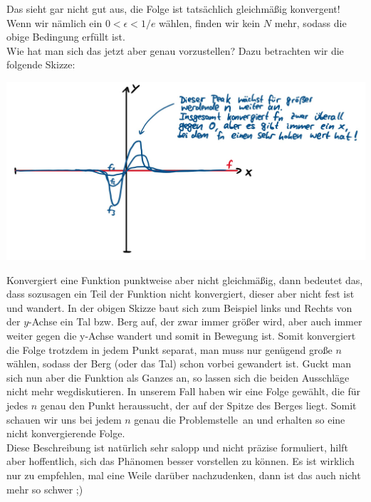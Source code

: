 \begin{Beispiel}
\begin{equation*}
    \end{equation*}
    Das sieht gar nicht gut aus, die Folge ist tatsächlich  gleichmäßig konvergent! Wenn wir nämlich ein $0<\epsilon < 1/e$ wählen, finden wir kein $N$ mehr, sodass die obige Bedingung erfüllt ist. \\
    Wie hat man sich das jetzt aber genau vorzustellen? Dazu betrachten wir die folgende Skizze:
    \begin{center}
        \includegraphics[width=.95\textwidth]{Dateien/06/06VeranschaulichungFunktionenfolgen.jpg}
    \end{center}
    Konvergiert eine Funktion punktweise aber nicht gleichmäßig, dann bedeutet das, dass sozusagen ein Teil der Funktion nicht konvergiert, dieser aber nicht fest ist und \glqq wandert\grqq. In der obigen Skizze baut sich zum Beispiel links und Rechts von der $y$-Achse ein Tal bzw. Berg auf, der zwar immer größer wird, aber auch immer weiter gegen die y-Achse wandert und somit in Bewegung ist. Somit konvergiert die Folge trotzdem in jedem Punkt separat, man muss nur genügend große $n$ wählen, sodass der Berg (oder das Tal) schon vorbei gewandert ist. Guckt man sich nun aber die Funktion als Ganzes an, so lassen sich die beiden Ausschläge nicht mehr wegdiskutieren. In unserem Fall haben wir eine Folge gewählt, die für jedes $n$ genau den Punkt heraussucht, der auf der Spitze des Berges liegt. Somit schauen wir uns bei jedem $n$ genau die \glqq Problemstelle\grqq~an und erhalten so eine nicht konvergierende Folge. \\
    Diese Beschreibung ist natürlich sehr salopp und nicht präzise formuliert, hilft aber hoffentlich, sich das Phänomen besser vorstellen zu können. Es ist wirklich nur zu empfehlen, mal eine Weile darüber nachzudenken, dann ist das auch nicht mehr so schwer ;)
\end{Beispiel}

